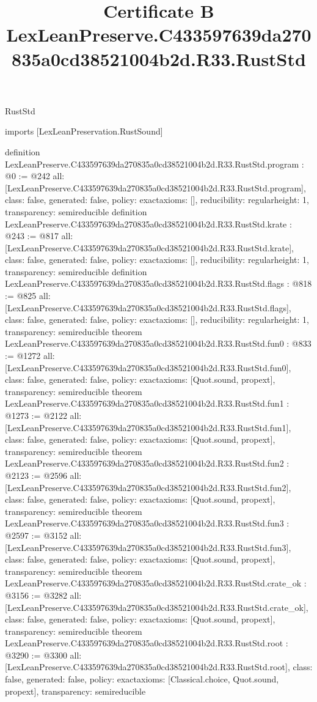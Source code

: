 \begin{lexlean}{RustStd}
\title{Certificate B LexLeanPreserve.C433597639da270835a0cd38521004b2d.R33.RustStd}
\begin{coremodule}
imports [LexLeanPreservation.RustSound]

definition LexLeanPreserve.C433597639da270835a0cd38521004b2d.R33.RustStd.program : @0 := @242 {
  all: [LexLeanPreserve.C433597639da270835a0cd38521004b2d.R33.RustStd.program],
  class: false,
  generated: false,
  policy: exact{axioms: []},
  reducibility: regular{height: 1},
  transparency: semireducible
}
definition LexLeanPreserve.C433597639da270835a0cd38521004b2d.R33.RustStd.krate : @243 := @817 {
  all: [LexLeanPreserve.C433597639da270835a0cd38521004b2d.R33.RustStd.krate],
  class: false,
  generated: false,
  policy: exact{axioms: []},
  reducibility: regular{height: 1},
  transparency: semireducible
}
definition LexLeanPreserve.C433597639da270835a0cd38521004b2d.R33.RustStd.flags : @818 := @825 {
  all: [LexLeanPreserve.C433597639da270835a0cd38521004b2d.R33.RustStd.flags],
  class: false,
  generated: false,
  policy: exact{axioms: []},
  reducibility: regular{height: 1},
  transparency: semireducible
}
theorem LexLeanPreserve.C433597639da270835a0cd38521004b2d.R33.RustStd.fun0 : @833 := @1272 {
  all: [LexLeanPreserve.C433597639da270835a0cd38521004b2d.R33.RustStd.fun0],
  class: false,
  generated: false,
  policy: exact{axioms: [Quot.sound, propext]},
  transparency: semireducible
}
theorem LexLeanPreserve.C433597639da270835a0cd38521004b2d.R33.RustStd.fun1 : @1273 := @2122 {
  all: [LexLeanPreserve.C433597639da270835a0cd38521004b2d.R33.RustStd.fun1],
  class: false,
  generated: false,
  policy: exact{axioms: [Quot.sound, propext]},
  transparency: semireducible
}
theorem LexLeanPreserve.C433597639da270835a0cd38521004b2d.R33.RustStd.fun2 : @2123 := @2596 {
  all: [LexLeanPreserve.C433597639da270835a0cd38521004b2d.R33.RustStd.fun2],
  class: false,
  generated: false,
  policy: exact{axioms: [Quot.sound, propext]},
  transparency: semireducible
}
theorem LexLeanPreserve.C433597639da270835a0cd38521004b2d.R33.RustStd.fun3 : @2597 := @3152 {
  all: [LexLeanPreserve.C433597639da270835a0cd38521004b2d.R33.RustStd.fun3],
  class: false,
  generated: false,
  policy: exact{axioms: [Quot.sound, propext]},
  transparency: semireducible
}
theorem LexLeanPreserve.C433597639da270835a0cd38521004b2d.R33.RustStd.crate_ok : @3156 := @3282 {
  all: [LexLeanPreserve.C433597639da270835a0cd38521004b2d.R33.RustStd.crate_ok],
  class: false,
  generated: false,
  policy: exact{axioms: [Quot.sound, propext]},
  transparency: semireducible
}
theorem LexLeanPreserve.C433597639da270835a0cd38521004b2d.R33.RustStd.root : @3290 := @3300 {
  all: [LexLeanPreserve.C433597639da270835a0cd38521004b2d.R33.RustStd.root],
  class: false,
  generated: false,
  policy: exact{axioms: [Classical.choice, Quot.sound, propext]},
  transparency: semireducible
}


\end{coremodule}
\end{lexlean}
